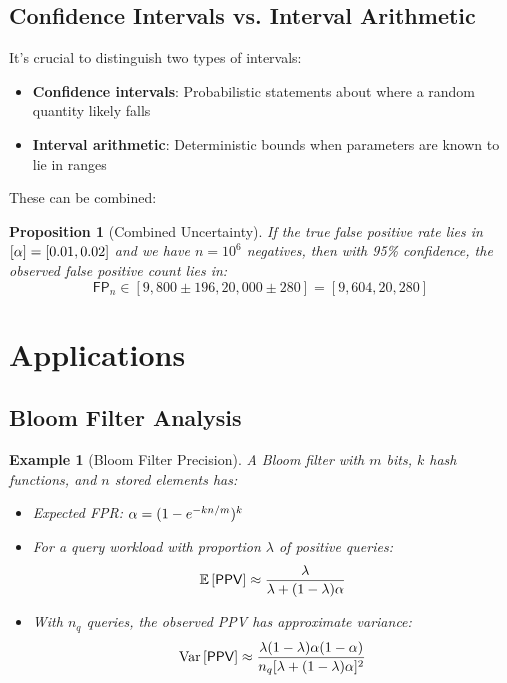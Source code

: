 \documentclass[11pt,final,hidelinks]{article}
\newtheorem{proposition}[theorem]{Proposition}
\newtheorem{example}[theorem]{Example}
\newcommand{\FP}{\mathsf{FP}}  %
\newcommand{\PPV}{\mathsf{PPV}}  %
\begin{document}
\subsection{Confidence Intervals vs. Interval Arithmetic}

It's crucial to distinguish two types of intervals:

\begin{itemize}
    \item \textbf{Confidence intervals}: Probabilistic statements about where a random quantity likely falls
    \item \textbf{Interval arithmetic}: Deterministic bounds when parameters are known to lie in ranges
\end{itemize}

These can be combined:

\begin{proposition}[Combined Uncertainty]
If the true false positive rate lies in $[\alpha] = [0.01, 0.02]$ and we have $n = 10^6$ negatives, then with 95\% confidence, the observed false positive count lies in:
\begin{equation}
\FP_n \in [9,800 \pm 196, 20,000 \pm 280] = [9,604, 20,280]
\end{equation}
\end{proposition}

\section{Applications}

\subsection{Bloom Filter Analysis}

\begin{example}[Bloom Filter Precision]
A Bloom filter with $m$ bits, $k$ hash functions, and $n$ stored elements has:
\begin{itemize}
    \item Expected FPR: $\alpha = (1 - e^{-kn/m})^k$
    \item For a query workload with proportion $\lambda$ of positive queries:
    \begin{equation}
    \Expect{\PPV} \approx \frac{\lambda}{\lambda + (1-\lambda)\fprate}
    \end{equation}
    \item With $n_q$ queries, the observed PPV has approximate variance:
    \begin{equation}
    \Var{\PPV} \approx \frac{\lambda(1-\lambda)\fprate(1-\fprate)}{n_q[\lambda + (1-\lambda)\fprate]^2}
    \end{equation}
\end{itemize}
\end{example}
\end{document}
